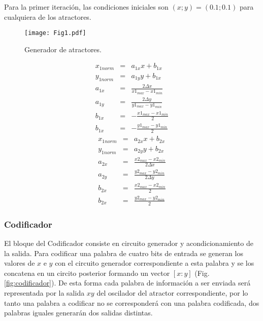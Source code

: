 Para la primer iteración, las condiciones iniciales son $(x;y)=(0.1;0.1)$ para cualquiera de los atractores.



\begin{figure}
    \centering
    \texttt{[image: Fig1.pdf]}\\
    \caption{Generador de atractores.}\label{fig:generador}
\end{figure}
{\small
\begin{eqnarray}\label{eq:norm_salida}
    x_{1norm}&=& a_{1x} x+b_{1x} \nonumber\\
    y_{1norm}&=& a_{1y} y+b_{1x} \nonumber\\
    a_{1x}&=& \frac{2\Delta x}{x1_{max}-x1_{min}} \nonumber\\
    a_{1y}&=& \frac{2\Delta y}{y1_{max}-y1_{min}} \nonumber\\
    b_{1x}&=& -\frac{x1_{max}-x1_{min}}{2} \nonumber\\
    b_{1x}&=& -\frac{y1_{max}-y1_{min}}{2}
\end{eqnarray}}
{\small
\begin{eqnarray}\label{eq:norm_entrada}
    x_{1norm}&=& a_{2x} x+b_{2x} \nonumber\\
    y_{1norm}&=& a_{2y} y+b_{2x} \nonumber\\
    a_{2x}&=& \frac{x2_{max}-x2_{min}}{2\Delta x} \nonumber\\
    a_{2y}&=& \frac{y2_{max}-y2_{min}}{2\Delta y} \nonumber\\
    b_{2x}&=& \frac{x2_{max}-x2_{min}}{2} \nonumber\\
    b_{2x}&=& \frac{y2_{max}-y2_{min}}{2}
\end{eqnarray}}

\subsubsection{Codificador}
El bloque del Codificador consiste en circuito generador y
acondicionamiento de la salida. Para codificar una palabra de
cuatro bits de entrada se generan los valores de $x$ e $y$ con el
circuito generador correspondiente a esta palabra y se los concatena en un circito posterior
formando un vector $[x:y]$ (Fig. \ref{fig:codificador}). De esta forma cada palabra de información a ser enviada será representada por la salida $xy$  del oscilador del atractor correspondiente, por lo tanto una palabra a codificar no se corresponderá con una palabra codificada, dos palabras iguales generarán dos salidas distintas.


